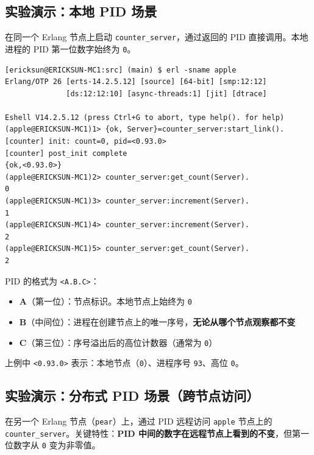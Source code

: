 \documentclass[a4paper,11pt]{article}
\begin{document}
\subsection{实验演示：本地 PID 场景}

在同一个 Erlang 节点上启动 \texttt{counter\_server}，通过返回的 PID 直接调用。本地进程的 PID 第一位数字始终为 \texttt{0}。

\begin{lstlisting}[style=shellstyle, caption={本地 PID 场景 --- 在 apple 节点上操作}]
[ericksun@ERICKSUN-MC1:src] (main) $ erl -sname apple
Erlang/OTP 26 [erts-14.2.5.12] [source] [64-bit] [smp:12:12]
              [ds:12:12:10] [async-threads:1] [jit] [dtrace]

Eshell V14.2.5.12 (press Ctrl+G to abort, type help(). for help)
(apple@ERICKSUN-MC1)1> {ok, Server}=counter_server:start_link().
[counter] init: count=0, pid=<0.93.0>
[counter] post_init complete
{ok,<0.93.0>}
(apple@ERICKSUN-MC1)2> counter_server:get_count(Server).
0
(apple@ERICKSUN-MC1)3> counter_server:increment(Server).
1
(apple@ERICKSUN-MC1)4> counter_server:increment(Server).
2
(apple@ERICKSUN-MC1)5> counter_server:get_count(Server).
2
\end{lstlisting}

\begin{notebox}[PID 结构]
PID 的格式为 \texttt{<A.B.C>}：
\begin{itemize}[leftmargin=1.5em]
    \item \textbf{A}（第一位）：节点标识。本地节点上始终为 \texttt{0}
    \item \textbf{B}（中间位）：进程在创建节点上的唯一序号，\textbf{无论从哪个节点观察都不变}
    \item \textbf{C}（第三位）：序号溢出后的高位计数器（通常为 \texttt{0}）
\end{itemize}
上例中 \texttt{<0.93.0>} 表示：本地节点（\texttt{0}）、进程序号 \texttt{93}、高位 \texttt{0}。
\end{notebox}

\subsection{实验演示：分布式 PID 场景（跨节点访问）}

在另一个 Erlang 节点（\texttt{pear}）上，通过 PID 远程访问 \texttt{apple} 节点上的 \texttt{counter\_server}。关键特性：\textbf{PID 中间的数字在远程节点上看到的不变}，但第一位数字从 \texttt{0} 变为非零值。
\end{document}
